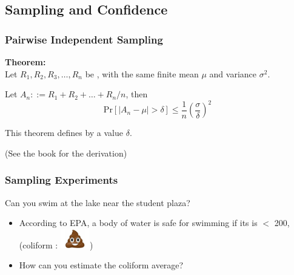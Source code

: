 \documentclass{beamer}
\begin{document}
\subsection{Sampling and Confidence}
\begin{frame}
  \frametitle{Pairwise Independent Sampling}

  {\bf Theorem:}\\

  Let $R_1, R_2, R_3, \ldots, R_n$ be , with the same finite mean $\mu$ and variance
  $\sigma^2$.

  \bigskip
  
  Let $A_n ::= R_1 + R_2 + \ldots + R_n / n$, then
  \begin{equation}
    \text{Pr}[|A_n - \mu| > \delta] \leq
    \frac{1}{n}\left(\frac{\sigma}{\delta}\right)^2
  \end{equation}

  \vfill

  This theorem defines  by a value $\delta$.

  \bigskip

  \hfill{\small (See the book for the derivation)}
\end{frame}

\begin{frame}
  \frametitle{Sampling Experiments}

  {\larger
  Can you swim at the lake near the student plaza?
  \bigskip

  \begin{itemize}
  \item According to EPA, a body of water is safe for swimming if its
     is $<$ 200, \\
    \hfill (coliform : \includegraphics[width=0.1\textwidth]{../img/poo})
    \bigskip
    
  \item How can you estimate the coliform average?
  \end{itemize}
  }
  
\end{frame}
  
\end{document}
